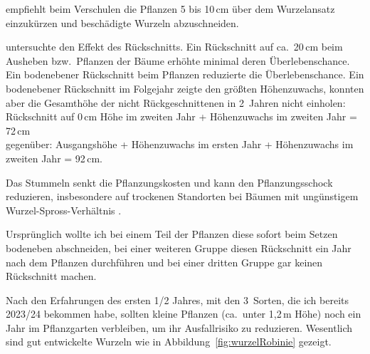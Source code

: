 \documentclass[twocolumn]{scrartcl}
\begin{document}
\citet{bund1899robinie} empfiehlt beim Verschulen die Pflanzen 5 bis
10\,cm über dem Wurzelansatz einzukürzen und beschädigte Wurzeln
abzuschneiden.

\citet{meginnis1940robinieRueckschnitt} untersuchte den Effekt des
Rückschnitts. Ein Rückschnitt auf ca.\ 20\,cm beim Ausheben
bzw.\ Pflanzen der Bäume erhöhte minimal deren Überlebenschance. Ein
bodenebener Rückschnitt beim Pflanzen reduzierte die
Überlebenschance. Ein bodenebener Rückschnitt im Folgejahr zeigte den
größten Höhenzuwachs, konnten aber die Gesamthöhe der nicht
Rückgeschnittenen in 2~Jahren nicht einholen:\\
Rückschnitt auf 0\,cm Höhe im zweiten Jahr + Höhenzuwachs im zweiten
Jahr = 72\,cm\\
gegenüber: Ausgangshöhe + Höhenzuwachs im ersten Jahr + Höhenzuwachs
im zweiten Jahr = 92\,cm.

Das Stummeln senkt die Pflanzungskosten und kann den Pflanzungsschock
reduzieren, insbesondere auf trockenen Standorten bei Bäumen mit
ungünstigem Wurzel-Spross-Verhältnis
\citep{south1996toppruning,south1998toppruning,south2016toppruning}.

Ursprünglich wollte ich bei einem Teil der Pflanzen diese sofort beim
Setzen bodeneben abschneiden, bei einer weiteren Gruppe diesen
Rückschnitt ein Jahr nach dem Pflanzen durchführen und bei einer
dritten Gruppe gar keinen Rückschnitt machen.

Nach den Erfahrungen des ersten 1/2 Jahres, mit den 3~Sorten, die ich
bereits 2023/24 bekommen habe, sollten kleine Pflanzen (ca.\ unter
1,2\,m Höhe) noch ein Jahr im Pflanzgarten verbleiben, um ihr
Ausfallrisiko zu reduzieren. Wesentlich sind gut entwickelte Wurzeln
wie in Abbildung~\ref{fig:wurzelRobinie} gezeigt.
\end{document}

